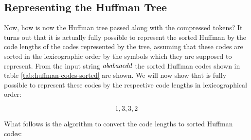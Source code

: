 \subsection{Representing the Huffman Tree}

Now, how is now the Huffman tree passed along with the compressed
tokens? It turns out that it is actually fully possible to represent
the sorted Huffman by the code lengths of the codes represented by the
tree, assuming that these codes are sorted in the lexicographic order
by the symbols which they are supposed to represent. From the input
string $\mathit{ababaacdd}$ the sorted Huffman codes shown in table
\ref{tab:huffman-codes-sorted} are shown. We will now show that is
fully possible to represent these codes by the respective code lengths
in lexicographical order:

\begin{equation*}
  1,3,3,2
\end{equation*}

What follows is the algorithm to convert the code lengths to sorted
Huffman codes:

